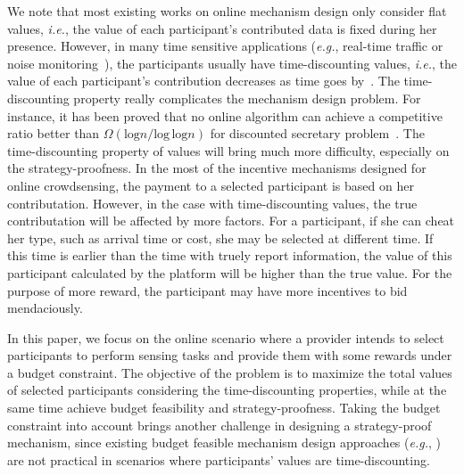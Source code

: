 \documentclass[10pt,journal,letterpaper,compsoc]{IEEEtran}
\newcommand{\ie}{{\em i.e.}}
\newcommand{\eg}{{\em e.g.}}
\begin{document}
We note that most existing works on online mechanism design only consider flat values, \ie, the value of each participant's contributed data is fixed during her presence. However, in many time sensitive applications (\eg, real-time traffic or noise monitoring~\cite{Chon:2014:SWP:2632048.2636066,Ji:2016:USB:2971648.2971735,Zappatore:2016:CAM:2851613.2851699,Cherian:2015:PPG:2809695.2817881}), the participants usually have time-discounting values, \ie, the value of each participant's contribution decreases as time goes by~\cite{babaioff2009secretary, wu2014strategy}. The time-discounting property really complicates the mechanism design problem. For instance, it has been proved that no online algorithm can achieve a competitive ratio better than $\Omega(\textrm{log}n/\textrm{log}\,\textrm{log}n)$ for discounted secretary problem~\cite{babaioff2009secretary}. The time-discounting property of values will bring much more difficulty, especially on the strategy-proofness. In the most of the incentive mechanisms designed for online crowdsensing, the payment to a selected participant is based on her contributation. However, in the case with time-discounting values, the true contributation will be affected by more factors. For a participant, if she can cheat her type, such as arrival time or cost, she may be selected at different time. If this time is earlier than the time with truely report information, the value of this participant calculated by the platform will be higher than the true value. For the purpose of more reward, the participant may have more incentives to bid mendaciously.


In this paper, we focus on the online scenario where a provider intends to select participants to perform sensing tasks and provide them with some rewards under a budget constraint. The objective of the problem is to maximize the total values of selected participants considering the time-discounting properties, while at the same time achieve budget feasibility and strategy-proofness. Taking the budget constraint into account brings another challenge in designing a strategy-proof mechanism, since existing budget feasible mechanism design approaches (\eg, \cite{singer2010budget, chen2011approximability,Bei:2012:BFM:2213977.2214020,Chen:2011:ABF:2133036.2133090}) are not practical in scenarios where participants' values are time-discounting.
\end{document}
